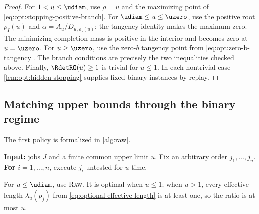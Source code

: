 \begin{proof}
For $1<u\le \udiam$, use $\rho=u$ and the maximizing point of
\cref{eq:opt:stopping-positive-branch}.  For
$\udiam\le u\le \uzero$, use the positive root $\rho_I(u)$ and
$\alpha=A_u/D_{u,\rho_I(u)}$; the tangency identity makes the maximum zero.
The minimizing completion mass is positive in the interior and becomes zero
at $u=\uzero$.  For $u\ge \uzero$, use the zero-$b$ tangency point from
\cref{eq:opt:zero-b-tangency}.  The branch conditions are precisely the two
inequalities checked above.  Finally, $\RdetRO(u)\ge1$ is trivial for $u\le1$.
In each nontrivial case \cref{lem:opt:hidden-stopping} supplies fixed binary
instances by replay.
\end{proof}

\subsection{Matching upper bounds through the binary regime}
\label{sec:opt:low-upper}

The first policy is formalized in \cref{alg:raw}.

\begin{algorithm}[H]
\caption{\textsc{Raw}$(J,u)$}
\label{alg:raw}
\begin{algorithmic}
\Statex \textbf{Input:} jobs $J$ and a finite common upper limit $u$.
\State Fix an arbitrary order $j_1,\ldots,j_n$.
\State \textbf{For} $i=1,\ldots,n$, execute $j_i$ untested for $u$ time.
\end{algorithmic}
\end{algorithm}

For $u\le \udiam$, use \textsc{Raw}.  It is optimal when $u\le1$;
when $u>1$, every effective length $\lambda_u(p_j)$ from
\cref{eq:optional-effective-length} is at least one, so the ratio is at most
$u$.

